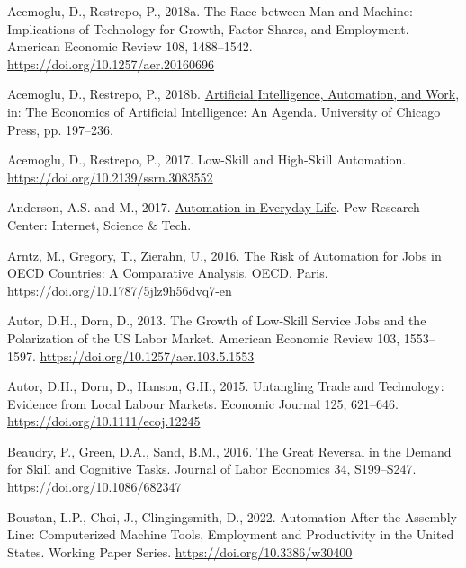 \documentclass[
  11,
  a4paperpaper,
]{article}
\newlength{\cslhangindent}
\newenvironment{CSLReferences}[2] %
 {\begin{list}{}{%
  \setlength{\itemindent}{0pt}
  \setlength{\leftmargin}{0pt}
  \setlength{\parsep}{0pt}
  \ifodd #1
   \setlength{\leftmargin}{\cslhangindent}
   \setlength{\itemindent}{-1\cslhangindent}
  \fi
  \setlength{\itemsep}{#2\baselineskip}}}
 {\end{list}}
\begin{document}
\begin{CSLReferences}{1}{0}
Acemoglu, D., Restrepo, P., 2018a. The {Race} between {Man} and
{Machine}: {Implications} of {Technology} for {Growth}, {Factor}
{Shares}, and {Employment}. American Economic Review 108, 1488--1542.
\url{https://doi.org/10.1257/aer.20160696}

Acemoglu, D., Restrepo, P., 2018b.
\href{https://www.nber.org/books-and-chapters/economics-artificial-intelligence-agenda/artificial-intelligence-automation-and-work}{Artificial
{Intelligence}, {Automation}, and {Work}}, in: The {Economics} of
{Artificial} {Intelligence}: {An} {Agenda}. University of Chicago Press,
pp. 197--236.

Acemoglu, D., Restrepo, P., 2017. Low-{Skill} and {High}-{Skill}
{Automation}. \url{https://doi.org/10.2139/ssrn.3083552}

Anderson, A.S. and M., 2017.
\href{https://www.pewresearch.org/internet/2017/10/04/automation-in-everyday-life/}{Automation
in {Everyday} {Life}}. Pew Research Center: Internet, Science \& Tech.

Arntz, M., Gregory, T., Zierahn, U., 2016. The {Risk} of {Automation}
for {Jobs} in {OECD} {Countries}: {A} {Comparative} {Analysis}. OECD,
Paris. \url{https://doi.org/10.1787/5jlz9h56dvq7-en}

Autor, D.H., Dorn, D., 2013. The {Growth} of {Low}-{Skill} {Service}
{Jobs} and the {Polarization} of the {US} {Labor} {Market}. American
Economic Review 103, 1553--1597.
\url{https://doi.org/10.1257/aer.103.5.1553}

Autor, D.H., Dorn, D., Hanson, G.H., 2015. Untangling {Trade} and
{Technology}: {Evidence} from {Local} {Labour} {Markets}. Economic
Journal 125, 621--646. \url{https://doi.org/10.1111/ecoj.12245}

Beaudry, P., Green, D.A., Sand, B.M., 2016. The {Great} {Reversal} in
the {Demand} for {Skill} and {Cognitive} {Tasks}. Journal of Labor
Economics 34, S199--S247. \url{https://doi.org/10.1086/682347}

Boustan, L.P., Choi, J., Clingingsmith, D., 2022. Automation {After} the
{Assembly} {Line}: {Computerized} {Machine} {Tools}, {Employment} and
{Productivity} in the {United} {States}. Working {Paper} {Series}.
\url{https://doi.org/10.3386/w30400}


\end{CSLReferences}
\end{document}

